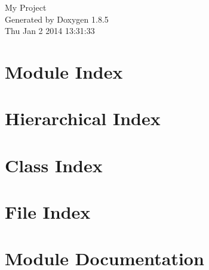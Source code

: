 \documentclass[twoside]{book}
\newcommand{\clearemptydoublepage}{%
  \newpage{\pagestyle{empty}\cleardoublepage}%
}
\begin{document}
\hypersetup{pageanchor=false}
\begin{titlepage}
\vspace*{7cm}
\begin{center}%
{\Large My Project }\\
\vspace*{1cm}
{\large Generated by Doxygen 1.8.5}\\
\vspace*{0.5cm}
{\small Thu Jan 2 2014 13:31:33}\\
\end{center}
\end{titlepage}
\clearemptydoublepage
\tableofcontents
\clearemptydoublepage
{}
\hypersetup{pageanchor=true}

\chapter{Module Index}

\chapter{Hierarchical Index}

\chapter{Class Index}

\chapter{File Index}

\chapter{Module Documentation}





\end{document}
